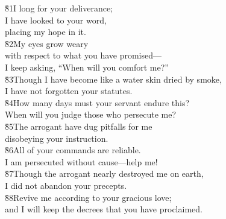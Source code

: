 \begin{poetry}
\poeml \v{81}I long for your deliverance; \\
\poemll    I have looked to your word, \\
\poemlll       placing my hope in it. \\
\poeml \v{82}My eyes grow weary \\
\poemll    with respect to what you have promised--- \\
\poemlll       I keep asking, ``When will you comfort me?'' \\
\poeml \v{83}Though I have become like a water skin dried by smoke, \\
\poemll    I have not forgotten your statutes. \\
\poeml \v{84}How many days must your servant endure this? \\
\poemll    When will you judge those who persecute me? \\
\poeml \v{85}The arrogant have dug pitfalls for me \\
\poemll    disobeying your instruction. \\
\poeml \v{86}All of your commands are reliable. \\
\poemll    I am persecuted without cause---help me! \\
\poeml \v{87}Though the arrogant nearly destroyed me on earth, \\
\poemll    I did not abandon your precepts. \\
\poeml \v{88}Revive me according to your gracious love; \\
\poemll    and I will keep the decrees that you have proclaimed.
\end{poetry}

